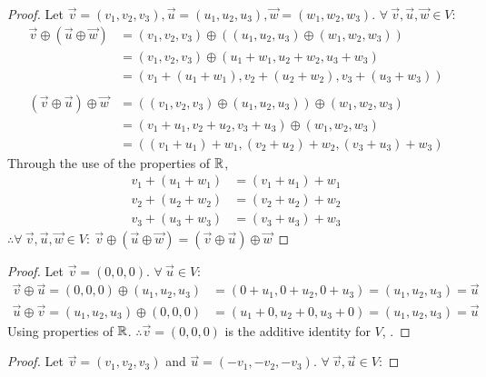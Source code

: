 \begin{enumerate}
  \begin{proof}
    Let $\vec{v}=(v_1,v_2,v_3),\vec{u}=(u_1,u_2,u_3),\vec{w}=(w_1,w_2,w_3)$. $\forall~\vec{v},\vec{u},\vec{w} \in V$:
    \begin{align*}
      \vec{v} \oplus (\vec{u} \oplus \vec{w}) & = (v_1,v_2,v_3) \oplus ((u_1,u_2,u_3) \oplus (w_1,w_2,w_3)) \\
                                              & = (v_1,v_2,v_3) \oplus (u_1+w_1,u_2+w_2,u_3+w_3)            \\
                                              & = (v_1+(u_1+w_1),v_2+(u_2+w_2),v_3+(u_3+w_3))               \\ \\
      (\vec{v} \oplus \vec{u}) \oplus \vec{w} & = ((v_1,v_2,v_3) \oplus (u_1,u_2,u_3)) \oplus (w_1,w_2,w_3) \\
                                              & = (v_1+u_1,v_2+u_2,v_3+u_3) \oplus (w_1,w_2,w_3)            \\
                                              & = ((v_1+u_1)+w_1,(v_2+u_2)+w_2,(v_3+u_3)+w_3)
    \end{align*}
    Through the use of the properties of $\mathbb{R}$,
    \begin{align*}
      v_1+(u_1+w_1) & = (v_1+u_1)+w_1 \\
      v_2+(u_2+w_2) & = (v_2+u_2)+w_2 \\
      v_3+(u_3+w_3) & = (v_3+u_3)+w_3
    \end{align*}
    $\therefore \forall~\vec{v},\vec{u},\vec{w} \in V:~\vec{v} \oplus (\vec{u} \oplus \vec{w}) = (\vec{v} \oplus \vec{u}) \oplus \vec{w}$
  \end{proof}
  \begin{proof}
    Let $\vec{v} = (0,0,0)$. $\forall~\vec{u} \in V$:
    \begin{align*}
      \vec{v} \oplus \vec{u} = (0,0,0) \oplus (u_1,u_2,u_3) & = (0+u_1,0+u_2,0+u_3) = (u_1,u_2,u_3) = \vec{u} \\
      \vec{u} \oplus \vec{v} = (u_1,u_2,u_3) \oplus (0,0,0) & = (u_1+0,u_2+0,u_3+0) = (u_1,u_2,u_3) = \vec{u}
    \end{align*}
    Using properties of $\mathbb{R}$. $\therefore \vec{v} = (0,0,0)$ is the additive identity for $V$, .
  \end{proof}
  \begin{proof}
    Let $\vec{v} = (v_1,v_2,v_3)$ and $\vec{u} = (-v_1,-v_2,-v_3)$. $\forall~\vec{v},\vec{u} \in V$:

\end{proof}
\end{enumerate}
